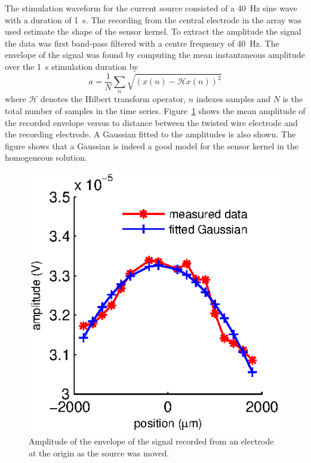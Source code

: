 \documentclass[]{article}
\begin{document}
The stimulation waveform for the current source consisted of a 40~Hz sine wave with a duration of 1~s. The recording from the central electrode in the array was used estimate the shape of the sensor kernel. To extract the amplitude the signal the data was first band-pass filtered with a centre frequency of 40~Hz. The envelope of the signal was found by computing the mean instantaneous amplitude over the 1~s stimulation duration by
\begin{equation}
	a = \frac{1}{N}\sum_n{\sqrt{(x(n)-\mathcal{H}x(n))^2}}
\end{equation}
where $\mathcal{H}$ denotes the Hilbert transform operator, $n$ indexes samples and $N$ is the total number of samples in the time series. Figure~\ref{fig:Ch3} shows the mean amplitude of the recorded envelope versus to distance between the twisted wire electrode and the recording electrode. A Gaussian fitted to the amplitudes is also shown. The figure shows that a Gaussian is indeed a good model for the sensor kernel in the homogeneous solution. 
\begin{figure}[h]
	\begin{center}
	\includegraphics[scale=1]{./Graph/eps/channel3fig.eps}
	\end{center}
	\caption{Amplitude of the envelope of the signal recorded from an electrode at the origin as the source was moved.}
	\label{fig:Ch3}
\end{figure}



\end{document}
